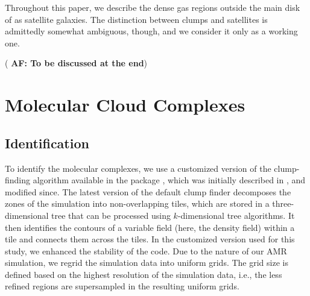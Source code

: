 \IfFileExists{emulateapjlegacy.cls}{\documentclass[iop]{emulateapjlegacy}}{\documentclass[iop]{emulateapj}}
\newcommand{\AF}[1]{({\bf \color{afcolor} AF: #1})}
\begin{document}
Throughout this paper, we describe the dense gas regions outside the main disk of \flower as satellite galaxies.
The distinction between clumps and satellites is admittedly somewhat
ambiguous, though, and we consider it only as a working one.

\AF{To be discussed at the end}

\section{Molecular Cloud Complexes}\label{sec:eqn}

\subsection{Identification}\label{sec:method}

To identify the molecular complexes, we use a customized version of
the clump-finding algorithm available in the  package
 \citep{Turk11a}, which was initially described in
\citet{Smith09a}, 
     and modified since.
The latest version of the default  clump finder decomposes
the zones of the simulation into non-overlapping tiles, which are
stored in a 
     three-dimensional tree that can be processed using $k$-dimensional tree algorithms.
It then identifies the contours of a variable field (here, the density
field) within a tile and connects them across the tiles. In the
customized version used for this study, we
     enhanced
the stability of the code.
%
Due to the nature of our AMR simulation, we regrid the simulation data into uniform grids. The grid size is defined based on the highest resolution of the simulation data, i.e., the less refined regions are supersampled in the resulting uniform grids.
\end{document}
